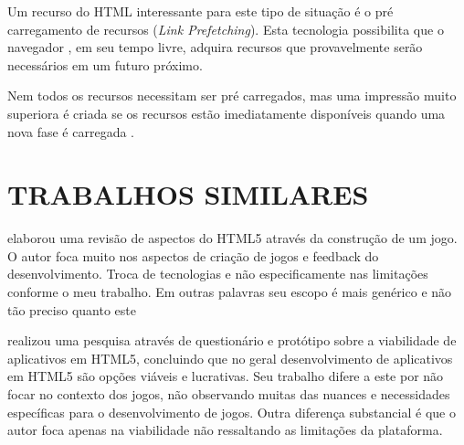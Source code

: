 Um recurso do HTML interessante para este tipo de situação é o pré
carregamento de recursos (\textit{Link Prefetching}). Esta tecnologia
possibilita que o navegador , em seu tempo livre, adquira recursos que
provavelmente serão necessários em um futuro próximo.

Nem todos os recursos necessitam ser pré carregados, mas uma impressão
muito superiora é criada se os recursos estão imediatamente
disponíveis quando uma nova fase é carregada \autocite[pp. 39]{creatingFun}.

\section{TRABALHOS SIMILARES}
\cite{crossPlatformMobileGame} elaborou uma revisão de aspectos do
HTML5 através da construção de um jogo. O autor foca muito nos
aspectos de criação de jogos e feedback do desenvolvimento. Troca
de tecnologias e não especificamente nas limitações conforme o meu
trabalho. Em outras palavras seu escopo é mais genérico e não tão
preciso quanto este

\cite{aSeriousContender} realizou uma pesquisa através de questionário
e protótipo sobre a viabilidade de aplicativos em HTML5, concluindo que
no geral desenvolvimento de aplicativos em HTML5 são opções viáveis
e lucrativas. Seu trabalho difere a este por não focar no contexto dos
jogos, não observando muitas das nuances e necessidades específicas
para o desenvolvimento de jogos. Outra diferença substancial é que o autor foca apenas na viabilidade não ressaltando as limitações da plataforma.
